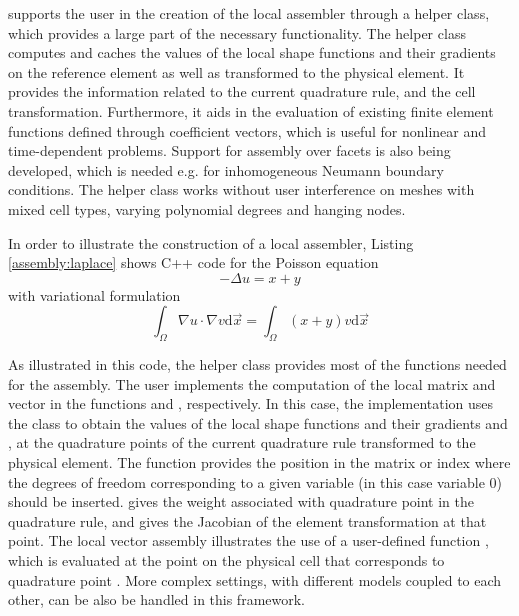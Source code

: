 \hiflow{} supports the user in the creation of the local assembler
through a helper class, which provides a large part of the necessary
functionality. The helper class computes and caches the values of
the local shape functions and their gradients on the reference element
as well as transformed to the physical element. It provides the
information related to the current quadrature rule, and the cell
transformation. Furthermore, it aids in the evaluation of existing
finite element functions defined through coefficient vectors, which is
useful for nonlinear and time-dependent problems. Support for assembly
over facets is also being developed, which is needed e.g.  for
inhomogeneous Neumann boundary conditions.  The helper class works
without user interference on meshes with mixed cell types, varying polynomial
degrees and hanging nodes.

In order to illustrate the construction of a local assembler, Listing
\ref{assembly:laplace} shows C++ code for the Poisson equation
\begin{displaymath}
  - \Delta{}u = x + y
\end{displaymath}
with variational formulation 
\begin{displaymath}
  \int_{\Omega}{\nabla{}u\cdot\nabla{}v{}\textrm{d}\vec{x}} = \int_{\Omega}{(x + y)v{}\textrm{d}\vec{x}}
\end{displaymath}



As illustrated in this code, the helper class 
provides most of the functions needed for the assembly. The user
implements the computation of the local matrix and vector in the
functions  and
, respectively. In this case, the
implementation uses the  class to obtain the
values of the local shape functions and their gradients  and
, at the quadrature points of the current quadrature 
rule transformed to the physical element. The function
 provides the position in the matrix or index where
the degrees of freedom corresponding to a given variable (in this case
variable $0$) should be inserted.  gives the weight
associated with quadrature point  in the quadrature rule, and
 gives the Jacobian of the element transformation at
that point. The local vector assembly illustrates the use of a
user-defined function , which is evaluated at the point
 on the physical cell that corresponds to quadrature point
. More complex settings, with different models coupled to each
other, can be also be handled in this framework.
